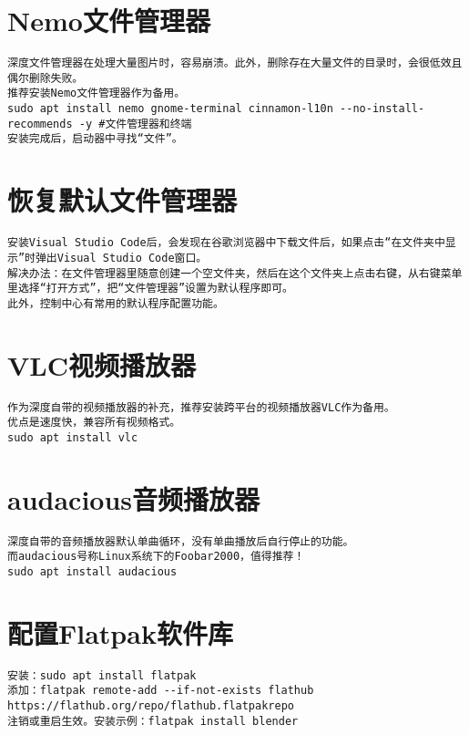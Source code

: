 \documentclass[a4paper,fontset=fandol,zihao=-4,linespread=1.2,oneside]{ctexbook}
\begin{document}
\section{Nemo文件管理器}
\begin{lstlisting}
深度文件管理器在处理大量图片时，容易崩溃。此外，删除存在大量文件的目录时，会很低效且偶尔删除失败。
推荐安装Nemo文件管理器作为备用。
sudo apt install nemo gnome-terminal cinnamon-l10n --no-install-recommends -y #文件管理器和终端
安装完成后，启动器中寻找“文件”。
\end{lstlisting}

\section{恢复默认文件管理器}
\begin{lstlisting}
安装Visual Studio Code后，会发现在谷歌浏览器中下载文件后，如果点击“在文件夹中显示”时弹出Visual Studio Code窗口。
解决办法：在文件管理器里随意创建一个空文件夹，然后在这个文件夹上点击右键，从右键菜单里选择“打开方式”，把“文件管理器”设置为默认程序即可。
此外，控制中心有常用的默认程序配置功能。
\end{lstlisting}

\section{VLC视频播放器}
\begin{lstlisting}
作为深度自带的视频播放器的补充，推荐安装跨平台的视频播放器VLC作为备用。
优点是速度快，兼容所有视频格式。
sudo apt install vlc
\end{lstlisting}

\section{audacious音频播放器}
\begin{lstlisting}
深度自带的音频播放器默认单曲循环，没有单曲播放后自行停止的功能。
而audacious号称Linux系统下的Foobar2000，值得推荐！
sudo apt install audacious
\end{lstlisting}

\section{配置Flatpak软件库}
\begin{lstlisting}
安装：sudo apt install flatpak
添加：flatpak remote-add --if-not-exists flathub https://flathub.org/repo/flathub.flatpakrepo
注销或重启生效。安装示例：flatpak install blender
\end{lstlisting}
\end{document}
